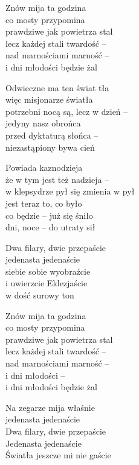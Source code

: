 \begin{text}
    Znów mija ta godzina\\
    co mosty przypomina\\
    prawdziwe jak powietrza stal\\
    lecz każdej stali twardość –\\
    nad marnościami marność –\\
    i dni młodości będzie żal

    Odwieczne ma ten świat tła\\
    więc misjonarze światła\\
    potrzebni nocą są, lecz w dzień –\\
    jedyny nasz obrońca\\
    przed dyktaturą słońca –\\
    niezastąpiony bywa cień

    Powiada kaznodzieja\\
    że w tym jest też nadzieja –\\
    w klepsydrze pył się zmienia w pył\\
    jest teraz to, co było\\
    co będzie – już się śniło\\
    dni, noce – do utraty sił

    Dwa filary, dwie przepaście\\
    jedenasta jedenaście\\
    siebie sobie wyobraźcie\\
    i uwierzcie Eklezjaście\\
    w dość surowy ton

    Znów mija ta godzina\\
    co mosty przypomina\\
    prawdziwe jak powietrza stal\\
    lecz każdej stali twardość –\\
    nad marnościami marność –\\
    i dni młodości –\\
    i dni młodości będzie żal

    Na zegarze mija właśnie\\
    jedenasta jedenaście\\
    Dwa filary, dwie przepaście\\
    Jedenasta jedenaście\\
    Światła jeszcze mi nie gaście
\end{text}
\begin{chord}

\end{chord}